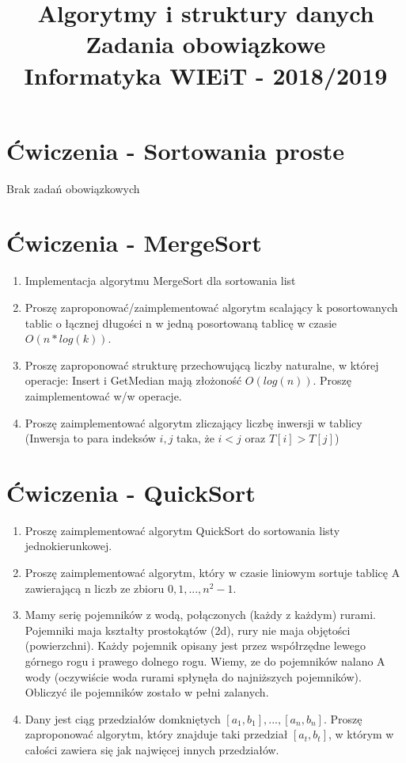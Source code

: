 \documentclass[11pt]{article}
\title{
	\textbf{
		\LARGE{Algorytmy i struktury danych}\linebreak \\
		\large{Zadania obowiązkowe} \\
		\normalsize{Informatyka WIEiT - 2018/2019 }} \\
}
\author{}
\date{}
\begin{document}
\lstset{language=C++,
	texcl=true,
	inputencoding=utf8,
	extendedchars=\true,
	}


\maketitle

\section{Ćwiczenia - Sortowania proste}
	Brak zadań obowiązkowych
\section{Ćwiczenia - MergeSort}

\begin{enumerate}
	\item Implementacja algorytmu MergeSort dla sortowania list
	
	\item Proszę zaproponować/zaimplementować algorytm scalający k posortowanych tablic o łącznej długości n
	w jedną posortowaną tablicę w czasie $O(n*log(k))$.
	
	\item Proszę zaproponować strukturę przechowującą liczby naturalne, w której operacje:
	Insert i GetMedian mają złożoność $O(log(n))$.
	Proszę zaimplementować w/w operacje.
	
	\item Proszę zaimplementować algorytm zliczający liczbę inwersji w tablicy
	(Inwersja to para indeksów $i,j$ taka, że $ i<j $ oraz $T[i]>T[j] $)
\end{enumerate}

\section{Ćwiczenia - QuickSort}

\begin{enumerate}
	\item Proszę zaimplementować algorytm QuickSort do sortowania listy jednokierunkowej.
	
	\item Proszę zaimplementować algorytm, który w czasie liniowym sortuje tablicę A zawierającą n liczb ze zbioru $ 0,1, ... ,n^2-1 $.
	
	\item Mamy serię pojemników z wodą, połączonych (każdy z każdym) rurami.
	Pojemniki maja kształty prostokątów (2d), rury nie maja objętości (powierzchni).
	Każdy pojemnik opisany jest przez współrzędne lewego górnego rogu i prawego dolnego rogu.
	Wiemy, ze do pojemników nalano A wody (oczywiście woda rurami spłynęła do najniższych pojemników).
	Obliczyć ile pojemników zostało w pełni zalanych.
	
	\item Dany jest ciąg przedziałów domkniętych $ [a_{1}, b_{1}], . . . ,[a_{n}, b_{n}]$.
	Proszę zaproponować algorytm, który znajduje taki przedział $[a_{t}, b_{t}]$,
	w którym w całości zawiera się jak najwięcej innych przedziałów.
\end{enumerate}
\end{document}
